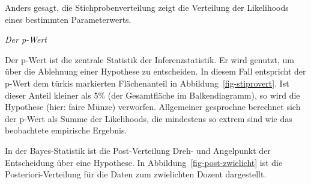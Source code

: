 \documentclass[
  a4paper,
  DIV=11]{scrreprt}
\theoremstyle{definition}
\theoremstyle{remark}
\begin{document}
Anders gesagt, die Stichprobenverteilung zeigt die Verteilung der
Likelihoods eines bestimmten Parameterwerts.

\begin{tcolorbox}[enhanced jigsaw, colframe=quarto-callout-note-color-frame, title=\textcolor{quarto-callout-note-color}{\faInfo}\hspace{0.5em}{Hinweis}, breakable, leftrule=.75mm, coltitle=black, toptitle=1mm, bottomrule=.15mm, bottomtitle=1mm, opacityback=0, arc=.35mm, rightrule=.15mm, left=2mm, colbacktitle=quarto-callout-note-color!10!white, opacitybacktitle=0.6, toprule=.15mm, titlerule=0mm, colback=white]
\emph{Der p-Wert}

Der p-Wert ist die zentrale Statistik der Inferenzstatistik. Er wird
genutzt, um über die Ablehnung einer Hypothese zu entscheiden. In diesem
Fall entspricht der p-Wert dem türkis markierten Flächenanteil in
Abbildung~\ref{fig-stiprovert}. Ist dieser Anteil kleiner als 5\% (der
Gesamtfläche im Balkendiagramm), so wird die Hypothese (hier: faire
Münze) verworfen. Allgemeiner gesprochne berechnet sich der p-Wert als
Summe der Likelihoods, die mindestens so extrem sind wie das beobachtete
empirische Ergebnis.
\end{tcolorbox}

In der Bayes-Statistik ist die Post-Verteilung Dreh- und Angelpunkt der
Entscheidung über eine Hypothese. In Abbildung~\ref{fig-post-zwielicht}
ist die Posteriori-Verteilung für die Daten zum zwielichten Dozent
dargestellt.
\end{document}

